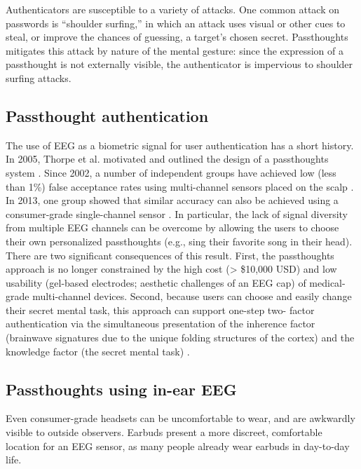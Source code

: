 \documentclass[sigconf]{acmart}
\begin{document}
Authenticators are susceptible to a variety of attacks. 
One common attack on passwords is ``shoulder surfing,'' in which an attack uses visual or other cues to steal, or improve the chances of guessing, a target's chosen secret. 
Passthoughts mitigates this attack by nature of the mental gesture:
since the expression of a passthought is not externally visible, the authenticator is impervious to shoulder surfing attacks.

\subsection{Passthought authentication}
\label{sec:org6be6687}

The use of EEG as a biometric signal for user authentication has a short history.
In 2005, Thorpe et al. motivated and outlined the design of a passthoughts system \cite{Thorpe2005}. Since 2002, a number of independent groups have achieved low (less than 1\%) false acceptance rates using multi-channel sensors placed on the scalp \cite{Poulos2002,Marcel2007a,Palaniappan2008,Ashby2011}.
In 2013, one group showed that similar accuracy can also be
achieved using a consumer-grade single-channel sensor \cite{Chuang2013b}. 
In particular, the lack of signal diversity from multiple EEG channels can be overcome by allowing
the users to choose their own personalized passthoughts (e.g., sing their favorite
song in their head). There are two significant consequences of this result. First,
the passthoughts approach is no longer constrained by the high cost (> \$10,000 USD)
and low usability (gel-based electrodes; aesthetic challenges of an EEG cap) of
medical-grade multi-channel devices. Second, because users can choose and
easily change their secret mental task, this approach can support one-step two-
factor authentication via the simultaneous presentation of the inherence factor
(brainwave signatures due to the unique folding structures of the cortex) and the
knowledge factor (the secret mental task) \cite{Chuang2014}.

\subsection{Passthoughts using in-ear EEG}
\label{sec:orgae7c8cc}

Even consumer-grade headsets can be uncomfortable to wear, and are awkwardly visible to outside observers. Earbuds present a more discreet, comfortable location for an EEG sensor, as many people already wear earbuds in day-to-day life.
\end{document}
